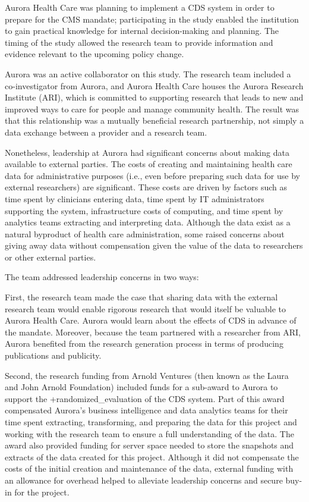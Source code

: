 \documentclass[
]{WileySix}
\begin{document}
Aurora Health Care was planning to implement a CDS system in order to prepare for the CMS mandate; participating in the study enabled the institution to gain practical knowledge for internal decision-making and planning. The timing of the study allowed the research team to provide information and evidence relevant to the upcoming policy change.

Aurora was an active collaborator on this study. The research team included a co-investigator from Aurora, and Aurora Health Care houses the Aurora Research Institute (ARI), which is committed to supporting research that leads to new and improved ways to care for people and manage community health. The result was that this relationship was a mutually beneficial research partnership, not simply a data exchange between a provider and a research team.

Nonetheless, leadership at Aurora had significant concerns about making data available to external parties. The costs of creating and maintaining health care data for administrative purposes (i.e., even before preparing such data for use by external researchers) are significant. These costs are driven by factors such as time spent by clinicians entering data, time spent by IT administrators supporting the system, infrastructure costs of computing, and time spent by analytics teams extracting and interpreting data. Although the data exist as a natural byproduct of health care administration, some raised concerns about giving away data without compensation given the value of the data to researchers or other external parties.

The team addressed leadership concerns in two ways:

First, the research team made the case that sharing data with the external research team would enable rigorous research that would itself be valuable to Aurora Health Care. Aurora would learn about the effects of CDS in advance of the mandate. Moreover, because the team partnered with a researcher from ARI, Aurora benefited from the research generation process in terms of producing publications and publicity.

Second, the research funding from Arnold Ventures (then known as the Laura and John Arnold Foundation) included funds for a sub-award to Aurora to support the +randomized\_evaluation\textbar{} of the CDS system. Part of this award compensated Aurora's business intelligence and data analytics teams for their time spent extracting, transforming, and preparing the data for this project and working with the research team to ensure a full understanding of the data. The award also provided funding for server space needed to store the snapshots and extracts of the data created for this project. Although it did not compensate the costs of the initial creation and maintenance of the data, external funding with an allowance for overhead helped to alleviate leadership concerns and secure buy-in for the project.
\end{document}
